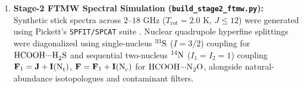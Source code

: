 \documentclass[journal=jpclcd,manuscript=article]{achemso}
\begin{document}
\begin{enumerate}
  \begin{equation}
    \Delta E_{\mathrm{int}} = \Delta E_{\mathrm{el-prep}}^{\mathrm{ref}} + E_{\mathrm{elstat}}^{\mathrm{ref}} + E_{\mathrm{exch}}^{\mathrm{ref}} + E_{\mathrm{disp}}^{\mathrm{C-CCSD}} + E_{\mathrm{disp}}^{\mathrm{C-(T1)}} + \Delta E_{\mathrm{non-disp}}^{\mathrm{C-CCSD}} + \Delta E_{\mathrm{non-disp}}^{\mathrm{C-(T1)}}.
  \end{equation}
  \item \textbf{Stage-2 FTMW Spectral Simulation (\texttt{build\_stage2\_ftmw.py}):} Synthetic stick spectra across $2\text{--}18\text{ GHz}$ ($T_{\mathrm{rot}} = 2.0\text{ K}$, $J \le 12$) were generated using Pickett's \texttt{SPFIT/SPCAT} suite \cite{Pickett1991}. Nuclear quadrupole hyperfine splittings were diagonalized using single-nucleus $^{33}\ce{S}$ ($I = 3/2$) coupling for $\ce{HCOOH\bond{...}H2S}$ and sequential two-nucleus $^{14}\ce{N}$ ($I_1 = I_2 = 1$) coupling $\mathbf{F}_1 = \mathbf{J} + \mathbf{I}(\ce{N_t})$, $\mathbf{F} = \mathbf{F}_1 + \mathbf{I}(\ce{N_c})$ for $\ce{HCOOH\bond{...}N2O}$, alongside natural-abundance isotopologues and contaminant filters.
\end{enumerate}
\end{document}
